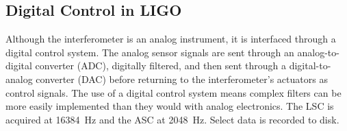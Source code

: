 





\subsection{Digital Control in LIGO}
Although the interferometer is an analog instrument, it is interfaced
through a digital control system. The analog sensor signals are sent
through an analog-to-digital converter (ADC), digitally filtered, and
then sent through a digital-to-analog converter (DAC) before returning
to the interferometer's actuators as control signals. The use of a
digital control system means complex filters can be more easily
implemented than they would with analog electronics. The LSC is
acquired at 16384~Hz and the ASC at 2048~Hz. Select data is recorded
to disk.





